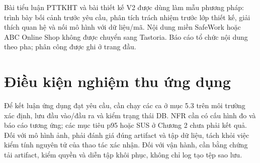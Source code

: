 Bài tiểu luận PTTKHT và bài thiết kế V2 được dùng làm mẫu phương pháp: trình bày bối cảnh trước yêu cầu, phân tích trách nhiệm trước lớp thiết kế, giải thích quan hệ và nối mô hình với dữ liệu/\allowbreak{}mã. Nội dung miền SafeWork hoặc ABC Online Shop không được chuyển sang Tastoria. Báo cáo tổ chức nội dung theo pha; phân công được ghi ở trang đầu.

\section{Điều kiện nghiệm thu ứng dụng}
Để kết luận ứng dụng đạt yêu cầu, cần chạy các ca ở mục 5.3 trên môi trường xác định, lưu đầu vào/\allowbreak{}đầu ra và kiểm trạng thái DB. NFR cần có cấu hình đo và báo cáo tương ứng; các mục tiêu p95 hoặc SUS ở Chương 2 chưa phải kết quả. Đối với mô hình ảnh, phải đánh giá đúng artifact và tập dữ liệu, tách khỏi việc kiểm tính nguyên tử của thao tác xác nhận. Đối với vận hành, cần bằng chứng tải artifact, kiểm quyền và diễn tập khôi phục, không chỉ log tạo tệp sao lưu.
